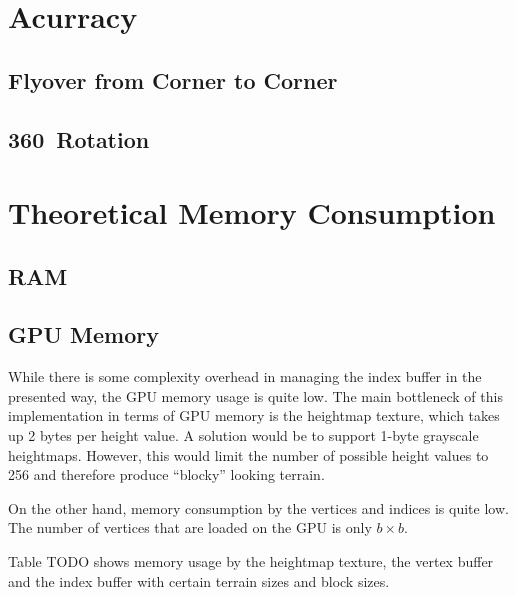 \section{Acurracy}
\subsection{Flyover from Corner to Corner}
\subsection{360\textdegree~Rotation}

\section{Theoretical Memory Consumption}
\subsection{RAM}


\subsection{GPU Memory}
While there is some complexity overhead in managing the index buffer 
in the presented way, the GPU memory usage is quite low.
The main bottleneck of this implementation in terms of GPU memory is 
the heightmap texture, which takes up 2 bytes per height value.
A solution would be to support 1-byte grayscale heightmaps. However, this would 
limit the number of possible height values to 256 and therefore produce
``blocky'' looking terrain.

On the other hand, memory consumption by the vertices and indices is quite low.
The number of vertices that are loaded on the GPU is only $b \times b$.

Table TODO shows memory usage by the heightmap texture, the vertex buffer and the index buffer 
with certain terrain sizes and block sizes.

